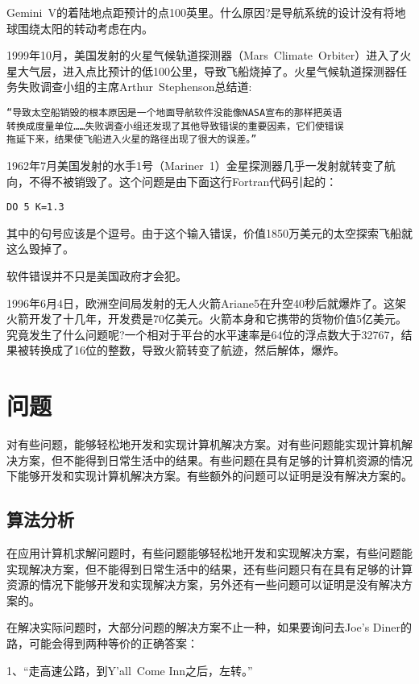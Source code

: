 Gemini~V的着陆地点距预计的点100英里。什么原因?是导航系统的设计没有将地球围绕太阳的转动考虑在内。

1999年10月，美国发射的火星气候轨道探测器（Mars~Climate~Orbiter）进入了火星大气层，进入点比预计的低100公里，导致飞船烧掉了。火星气候轨道探测器任务失败调查小组的主席Arthur~Stephenson总结道:
\begin{verbatim}
“导致太空船销毁的根本原因是一个地面导航软件没能像NASA宣布的那样把英语
转换成度量单位……失败调查小组还发现了其他导致错误的重要因素，它们使错误
拖延下来，结果使飞船进入火星的路径出现了很大的误差。”
\end{verbatim}

1962年7月美国发射的水手1号（Mariner~1）金星探测器几乎一发射就转变了航向，不得不被销毁了。这个问题是由下面这行Fortran代码引起的：
\begin{verbatim}
DO 5 K=1.3
\end{verbatim}
其中的句号应该是个逗号。由于这个输入错误，价值1850万美元的太空探索飞船就这么毁掉了。

软件错误并不只是美国政府才会犯。

1996年6月4日，欧洲空间局发射的无人火箭Ariane5在升空40秒后就爆炸了。这架火箭开发了十几年，开发费是70亿美元。火箭本身和它携带的货物价值5亿美元。究竟发生了什么问题呢?一个相对于平台的水平速率是64位的浮点数大于32767，结果被转换成了16位的整数，导致火箭转变了航迹，然后解体，爆炸。

\chapter{问题}

对有些问题，能够轻松地开发和实现计算机解决方案。对有些问题能实现计算机解决方案，但不能得到日常生活中的结果。有些问题在具有足够的计算机资源的情况下能够开发和实现计算机解决方案。有些额外的问题可以证明是没有解决方案的。

\section{算法分析}

在应用计算机求解问题时，有些问题能够轻松地开发和实现解决方案，有些问题能实现解决方案，但不能得到日常生活中的结果，还有些问题只有在具有足够的计算资源的情况下能够开发和实现解决方案，另外还有一些问题可以证明是没有解决方案的。

在解决实际问题时，大部分问题的解决方案不止一种，如果要询问去Joe’s Diner的路，可能会得到两种等价的正确答案：

1、“走高速公路，到Y’all~Come Inn之后，左转。”

